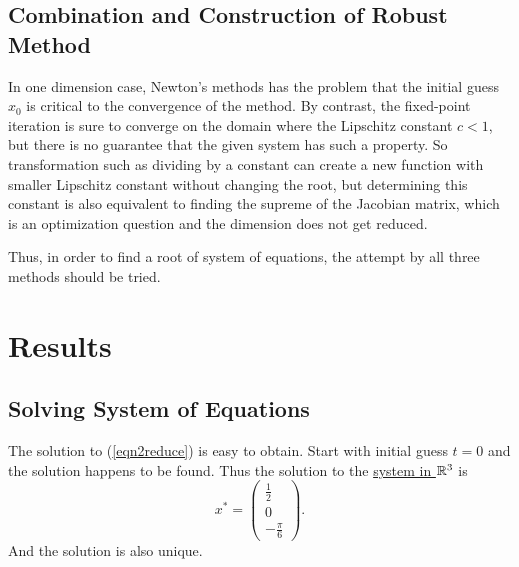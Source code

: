 \begin{table}[H]
\subsection{Combination and Construction of Robust Method}
In one dimension case, Newton's methods has the problem that the initial guess \(x_0\) is critical to the convergence of the method.
By contrast, the fixed-point iteration is sure to converge on the domain where the Lipschitz constant \(c<1\), but there is no guarantee that the given system has such a property.
So transformation such as dividing by a constant can create a new function with smaller Lipschitz constant without changing the root, but determining this constant is also equivalent to finding the supreme of the Jacobian matrix, which is an optimization question and the dimension does not get reduced.

Thus, in order to find a root of system of equations, the attempt by all three methods should be tried.




\section{Results}

\subsection{Solving System of Equations}
The solution to (\ref{eqn2reduce}) is easy to obtain.
Start with initial guess \(t=0\) and the solution happens to be found.
Thus the solution to the \hyperref[eqn2]{system in \(\mathbb{R}^3\)} is
\[ x^*=\begin{pmatrix} \frac{1}{2} \\ 0 \\ -\frac{\pi}{6} \end{pmatrix}. \]
And the solution is also unique.





\end{table}
